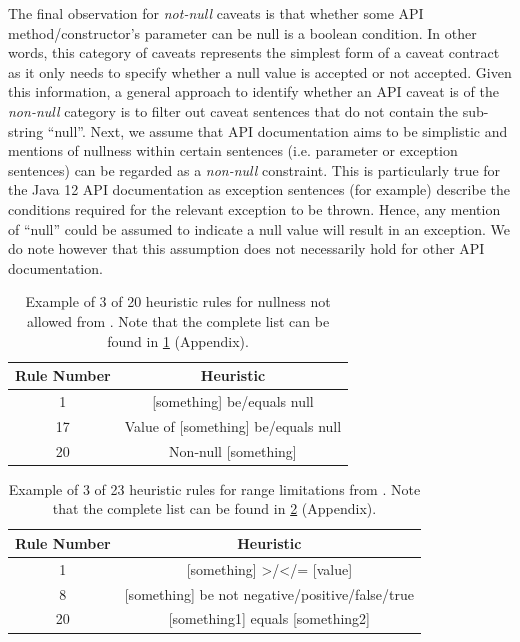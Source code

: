 The final observation for \textit{not-null} caveats is that whether some API method/constructor's parameter can be null is a boolean condition. In other words, this category of caveats represents the simplest form of a caveat contract as it only needs to specify whether a null value is accepted or not accepted. Given this information, a general approach to identify whether an API caveat is of the \textit{non-null} category is to filter out caveat sentences that do not contain the sub-string ``null''. Next, we assume that API documentation aims to be simplistic and mentions of nullness within certain sentences (i.e. parameter or exception sentences) can be regarded as a \textit{non-null} constraint. This is particularly true for the Java 12 API documentation as exception sentences (for example) describe the conditions required for the relevant exception to be thrown. Hence, any mention of ``null'' could be assumed to indicate a null value will result in an exception. We do note however that this assumption does not necessarily hold for other API documentation. \\

\begin{table}[h]
	\centering
	\begin{tabular}{|cc|}
		\hline
		Rule Number & Heuristic \\ \hline
		1 & [something] be/equals null \\
		17 & Value of [something] be/equals null \\
		20 & Non-null [something] \\ \hline
	\end{tabular}
	\caption{Example of 3 of 20 heuristic rules for nullness not allowed from \cite{zhou-directive}. Note that the complete list can be found in \ref{tab:not-null-heuristic} (Appendix).}
	\label{tab:not-null-heuristic}
\end{table}

\begin{table}[h]
	\centering
	\begin{tabular}{|cc|}
		\hline
		Rule Number & Heuristic \\ \hline
		1 & [something] >/</= [value] \\
		8 & [something] be {not} negative/positive/false/true \\
		20 & [something1] equals [something2] \\ \hline
	\end{tabular}
	\caption{Example of 3 of 23 heuristic rules for range limitations from \cite{zhou-directive}. Note that the complete list can be found in \ref{tab:range-limit-heuristic} (Appendix).}
	\label{tab:range-limit-heuristic}
\end{table}


